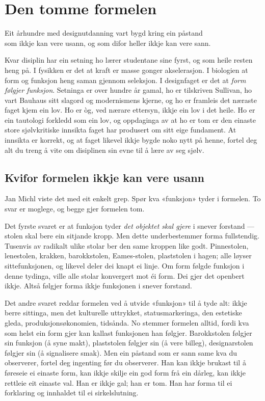 \chapter{Den tomme formelen}

\begin{motto}
Eit århundre med designutdanning vart bygd kring ein påstand\\ som ikkje kan vere usann, og som difor heller ikkje kan vere sann.
\end{motto}

Kvar disiplin har ein setning ho lærer studentane sine fyrst, og som heile resten heng på. I fysikken er det at kraft er masse gonger akselerasjon. I biologien at form og funksjon heng saman gjennom seleksjon. I designfaget er det at \emph{form følgjer funksjon}. Setninga er over hundre år gamal, ho er tilskriven Sullivan, ho vart Bauhaus sitt slagord og modernismens kjerne, og ho er framleis det næraste faget kjem ein lov. Ho er òg, ved nærare ettersyn, ikkje ein lov i det heile. Ho er ein tautologi forkledd som ein lov, og oppdaginga av at ho er tom er den einaste store sjølvkritiske innsikta faget har produsert om sitt eige fundament. At innsikta er korrekt, og at faget likevel ikkje bygde noko nytt på henne, fortel deg alt du treng å vite om disiplinen sin evne til å lære av seg sjølv.

\section{Kvifor formelen ikkje kan vere usann}

Jan Michl viste det med eit enkelt grep. Spør kva «funksjon» tyder i formelen. To svar er moglege, og begge gjer formelen tom.

Det fyrste svaret er at funksjon tyder \emph{det objektet skal gjere} i snever forstand — stolen skal bere ein sitjande kropp. Men dette underbestemmer forma fullstendig. Tusenvis av radikalt ulike stolar ber den same kroppen like godt. Pinnestolen, lenestolen, krakken, barokkstolen, Eames-stolen, plaststolen i hagen; alle løyser sittefunksjonen, og likevel deler dei knapt ei linje. Om form følgde funksjon i denne tydinga, ville alle stolar konvergert mot éi form. Dei gjer det openbert ikkje. Altså følgjer forma ikkje funksjonen i snever forstand.

Det andre svaret reddar formelen ved å utvide «funksjon» til å tyde alt: ikkje berre sittinga, men det kulturelle uttrykket, statusmarkeringa, den estetiske gleda, produksjonsøkonomien, tidsånda. No stemmer formelen alltid, fordi kva som helst ein form gjer kan kallast funksjonen han følgjer. Barokkstolen følgjer sin funksjon (å syne makt), plaststolen følgjer sin (å vere billeg), designarstolen følgjer sin (å signalisere smak). Men ein påstand som er sann same kva du observerer, fortel deg ingenting før du observerer. Han kan ikkje brukast til å føreseie ei einaste form, kan ikkje skilje ein god form frå ein dårleg, kan ikkje rettleie eit einaste val. Han er ikkje gal; han er tom. Han har forma til ei forklaring og innhaldet til ei sirkelslutning.


